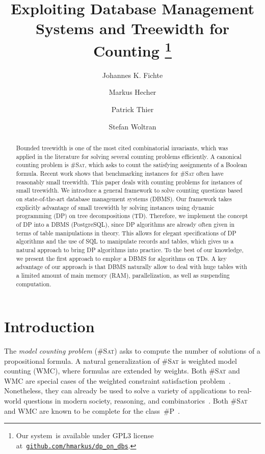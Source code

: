 \documentclass{llncs}
\title{Exploiting Database Management Systems and Treewidth for Counting%
  \thanks{%
    Our system~\dpdb is available under GPL3 license
    at~\href{https://github.com/hmarkus/dp_on_dbs/releases/tag/TODOv1.001-pre}{\nolinkurl{github.com/hmarkus/dp_on_dbs}}.
  }%
%
}
\author{Johannes K. Fichte\inst{1}\orcidID{0000-0002-8681-7470}%
  \and Markus Hecher\inst{2,3}\orcidID{0000-0003-0131-6771} 
  \and Patrick Thier\inst{2}\orcidID{TODO0000-0003-0131-6771}
  \and Stefan Woltran\inst{2}\orcidID{TODO0000-0003-0131-6771}
}%
\institute{TU Dresden, %
  Germany \email{johannes.fichte@tu-dresden.de} %
  \and TU Wien, %
  Austria \email{\{hecher,woltran,thier\}@dbai.tuwien.ac.at} \and %
  University of
  Potsdam, %
  Germany \email{hecher@uni-potsdam.de}
%
%
%
%
}
\newcommand{\sharpP}{\#P\xspace}
\newcommand{\cSAT}{\textsc{\#Sat}\xspace}%
\newcommand{\WMC}{\textsc{WMC}\xspace}%
\begin{document}
\maketitle

\begin{abstract}
Bounded treewidth is one of the most cited combinatorial invariants, which was applied in the literature for solving several counting problems efficiently. 
A canonical counting problem is \cSAT, which asks to count the satisfying assignments of a Boolean formula. Recent work shows that benchmarking instances for \cSAT often have reasonably small treewidth. %
This paper deals with counting problems for instances of small treewidth. We introduce a general framework to solve counting questions based on state-of-the-art database management systems (DBMS). Our framework takes explicitly advantage of small treewidth by solving instances using dynamic programming (DP) on tree decompositions (TD). Therefore, we implement the concept of DP into a DBMS (PostgreSQL), since DP algorithms are already often given in terms of table manipulations in theory. This allows for elegant specifications of DP algorithms and the use of SQL to manipulate records and tables, which gives us a natural approach to bring DP algorithms into practice. To the best of our knowledge, we present the first
approach to employ a DBMS for algorithms on TDs. A key advantage of our approach is that DBMS naturally allow to deal with huge tables with a limited amount of main memory (RAM), parallelization, as well as suspending %
computation.
\end{abstract}

\section{Introduction}
The \emph{model counting problem} (\cSAT) asks to compute the number
of solutions of a propositional formula.
%
A natural generalization of \cSAT is weighted model counting (\WMC),
where formulas are extended by weights. 
%
Both \cSAT and \WMC are special cases of the weighted constraint
satisfaction problem~\cite{Larrosa02a,ShapiroHaralick81a}. Nonetheless,
they can
%
%
%
%
%
%
%
%
%
%
%
already be used to solve a variety of applications to real-world
questions in modern society, %
reasoning, and
combinatorics~\cite{ChoiBroeckDarwiche15a,DomshlakHoffmann07a,MeelEtAl17a,SangBeameKautz05a,XueChoiDarwiche12a}.
%
Both \cSAT and \WMC are known to be complete for the
class~\sharpP~\cite{BacchusDalmaoPitassi03,Roth96}.
\end{document}
